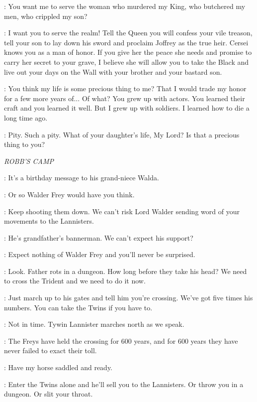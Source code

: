 \NED: You want me to serve the woman who murdered my King, who butchered my men, who crippled my son? 

\VARYS: I want you to serve the realm! Tell the Queen you will confess your vile treason, tell your son to lay down his sword and proclaim Joffrey as the true heir. Cersei knows you as a man of honor. If you give her the peace she needs and promise to carry her secret to your grave, I believe she will allow you to take the Black and live out your days on the Wall with your brother and your bastard son. 

\NED: You think my life is some precious thing to me? That I would trade my honor for a few more years of$\ldots$ Of what? You grew up with actors. You learned their craft and you learned it well. But I grew up with soldiers. I learned how to die a long time ago. 

\VARYS: Pity. Such a pity. What of your daughter's life, My Lord? Is that a precious thing to you? 


\scene

\textit{ROBB'S CAMP} 


\ROBB: It's a birthday message to his grand-niece Walda. 

\THEON: Or so Walder Frey would have you think. 

\CATELYN: Keep shooting them down. We can't risk Lord Walder sending word of your movements to the Lannisters. 

\ROBB: He's grandfather's bannerman. We can't expect his support? 

\UMBER: Expect nothing of Walder Frey and you'll never be surprised. 

\ROBB: Look. Father rots in a dungeon. How long before they take his head? We need to cross the Trident and we need to do it now. 

\THEON: Just march up to his gates and tell him you're crossing. We've got five times his numbers. You can take the Twins if you have to. 

\UMBER: Not in time. Tywin Lannister marches north as we speak. 

\CATELYN: The Freys have held the crossing for 600 years, and for 600 years they have never failed to exact their toll. 

\ROBB: Have my horse saddled and ready. 

\UMBER: Enter the Twins alone and he'll sell you to the Lannisters. Or throw you in a dungeon. Or slit your throat. 

